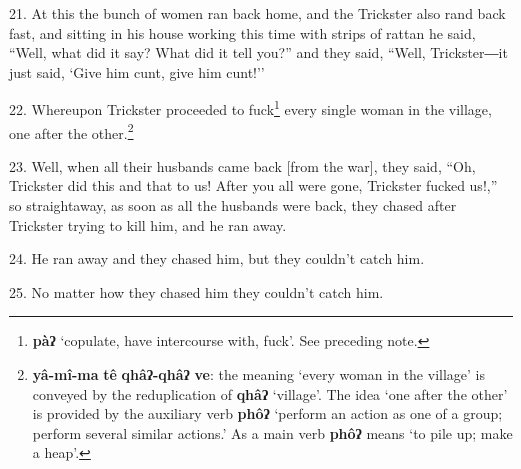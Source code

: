 21. At this the bunch of women ran back home, and the Trickster also rand back
fast, and sitting in his house working this time with strips of rattan he said,
``Well, what did it say? What did it tell you?'' and they said, ``Well, Trickster―it
just said, `Give him cunt, give him cunt!''

22. Whereupon Trickster proceeded to fuck\footnote{\textbf{pàʔ} `copulate, have intercourse with, fuck'. See preceding note.} every single woman in the village,
one after the other.\footnote{\textbf{yâ-mî-ma} \textbf{tê} \textbf{qhâʔ-qhâʔ} \textbf{ve}: the meaning `every woman in the village' is conveyed by the reduplication of \textbf{qhâʔ} `village'. The idea `one after the other' is provided by the auxiliary verb \textbf{phôʔ} `perform an action as one of a group; perform several similar actions.' As a main verb \textbf{phôʔ} means `to pile up; make a heap'.}

23. Well, when all their husbands came back [from the war], they said, ``Oh, Trickster
did this and that to us! After you all were gone, Trickster fucked us!,'' so straightaway,
as soon as all the husbands were back, they chased after Trickster trying to kill
him, and he ran away.

24. He ran away and they chased him, but they couldn't catch him.

25. No matter how they chased him they couldn't catch him.

